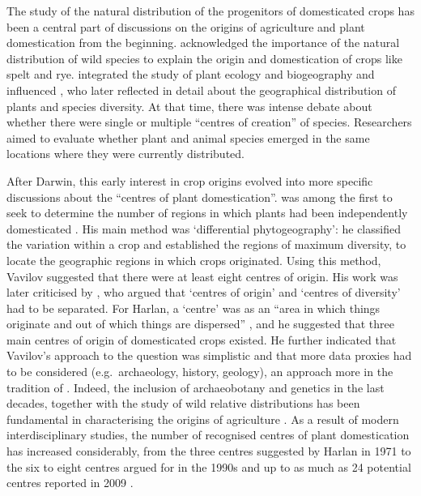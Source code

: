 \documentclass[
  authoryear,
  preprint]{elsarticle}
\begin{document}
The study of the natural distribution of the progenitors of domesticated
crops has been a central part of discussions on the origins of
agriculture and plant domestication from the beginning.
\citet{Humboldt1807} acknowledged the importance of the natural
distribution of wild species to explain the origin and domestication of
crops like spelt and rye. \citet{Candolle1886} integrated the study of
plant ecology and biogeography and influenced \citet{Darwin1859}, who
later reflected in detail about the geographical distribution of plants
and species diversity. At that time, there was intense debate about
whether there were single or multiple ``centres of creation'' of
species. Researchers aimed to evaluate whether plant and animal species
emerged in the same locations where they were currently distributed.

After Darwin, this early interest in crop origins evolved into more
specific discussions about the ``centres of plant domestication''.
\citet{Vavilov1926} was among the first to seek to determine the number
of regions in which plants had been independently domesticated
\citep{Harris1990}. His main method was `differential phytogeography':
he classified the variation within a crop and established the regions of
maximum diversity, to locate the geographic regions in which crops
originated. Using this method, Vavilov suggested that there were at
least eight centres of origin. His work was later criticised by
\citet{Harlan1971}, who argued that `centres of origin' and `centres of
diversity' had to be separated. For Harlan, a `centre' was as an ``area
in which things originate and out of which things are dispersed''
\citep[p.~468]{Harlan1971}, and he suggested that three main centres of
origin of domesticated crops existed. He further indicated that
Vavilov's approach to the question was simplistic and that more data
proxies had to be considered (e.g.~archaeology, history, geology), an
approach more in the tradition of \citet{Candolle1886}. Indeed, the
inclusion of archaeobotany and genetics in the last decades, together
with the study of wild relative distributions has been fundamental in
characterising the origins of agriculture \citep{FullerColledge2008}. As
a result of modern interdisciplinary studies, the number of recognised
centres of plant domestication has increased considerably, from the
three centres suggested by Harlan in 1971 to the six to eight centres
argued for in the 1990s \citep{Smith1995} and up to as much as 24
potential centres reported in 2009
\citetext{\citealp{PuruggananFuller2009}; \citealp[see
also][]{Fuller2010}}.
\end{document}
